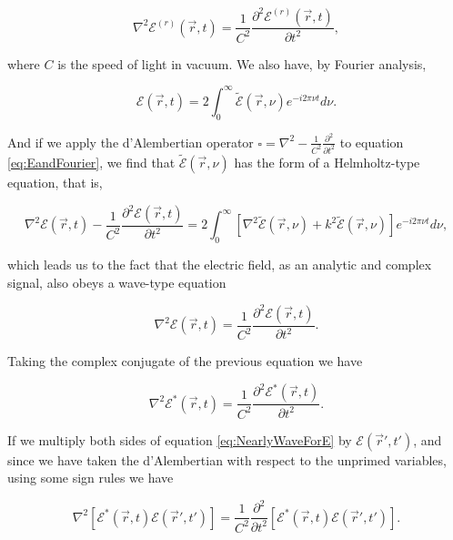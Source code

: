		\begin{equation}
			\nabla^2 \mathcal{E}^{(r)}(\vec{r},t) = \frac{1}{C^2}\frac{\partial^2 \mathcal{E}^{(r)}(\vec{r},t)}{\partial t^2},
		\end{equation}

		where $C$ is the speed of light in vacuum. We also have, by Fourier analysis,

		\begin{equation}\label{eq:EandFourier}
			\mathcal{E}(\vec{r},t) = 2\int_0^{\infty} \tilde{\mathcal{E}}(\vec{r},\nu) e^{-i2\pi\nu t}d\nu .
		\end{equation}

		And if we apply the d'Alembertian operator $\square = \nabla^2 -
		\frac{1}{C^2}\frac{\partial^2}{\partial t^2}$ to equation \eqref{eq:EandFourier}, we find
		that $\tilde{\mathcal{E}}(\vec{r},\nu)$ has the form of a Helmholtz-type equation, that is,

		\begin{equation}
			\nabla^2 \mathcal{E}(\vec{r},t) - \frac{1}{C^2}\frac{\partial^2 \mathcal{E}(\vec{r},t)}{\partial t^2} = 2\int_0^{\infty} \left[ \nabla^2 \tilde{\mathcal{E}}(\vec{r},\nu) + k^2 \tilde{\mathcal{E}}(\vec{r},\nu) \right]e^{-i2\pi\nu t}d\nu,
		\end{equation}

		which leads us to the fact that the electric field, as an analytic and complex signal, also
		obeys a wave-type equation

		\begin{equation}
			\nabla^2 \mathcal{E}(\vec{r},t) = \frac{1}{C^2}\frac{\partial^2 \mathcal{E}(\vec{r},t)}{\partial t^2}.
		\end{equation}

		Taking the complex conjugate of the previous equation we have

		\begin{equation}\label{eq:NearlyWaveForE}
			\nabla^2 \mathcal{E}^*(\vec{r},t) = \frac{1}{C^2}\frac{\partial^2 \mathcal{E}^*(\vec{r},t)}{\partial t^2}.
		\end{equation}

		If we multiply both sides of equation \eqref{eq:NearlyWaveForE} by
		$\mathcal{E}(\vec{r}',t')$, and since we have taken the d'Alembertian with respect to the
		unprimed variables, using some sign rules we have

		\begin{equation}\label{eq:NoAvg}
			\nabla^2 \left[ \mathcal{E}^*(\vec{r},t)\mathcal{E}(\vec{r}',t') \right] =  \frac{1}{C^2} \frac{\partial^2}{\partial t^2}\left[ \mathcal{E}^*(\vec{r},t)\mathcal{E}(\vec{r}',t') \right].
		\end{equation}

